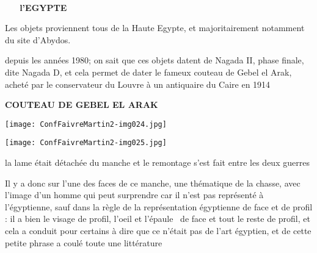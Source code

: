 \documentclass[a4paper]{article}
\begin{document}
\bigskip


\bigskip


\bigskip


\bigskip


\bigskip


\bigskip


\bigskip


\bigskip


\bigskip


\bigskip

{
\textbf{\ \ \ \ \ \ \ \ \ \ \ \ \ \ \ \ \ \ \ \ \ \ \ \ \ \ \ \ \ \ \ \ \ \ \ \ \ \ \ \ \ \ \ \ \ \ \ \ \ \ \ \ \ \ \ \ \ \ \ \ \ \ \ \ \ l'EGYPTE}}


\bigskip


\bigskip


\bigskip


\bigskip

{
Les objets proviennent tous de la Haute Egypte, et majoritairement notamment du site d'Abydos.}

{
depuis les années 1980; on sait que ces objets datent de Nagada II, phase finale, dite Nagada D, et cela permet de dater
le fameux couteau de Gebel el Arak, acheté par le conservateur du Louvre à un antiquaire du Caire en 1914}


\bigskip


\bigskip


\bigskip

{
\textbf{COUTEAU DE GEBEL EL ARAK\ \ }}


\bigskip


\bigskip


\bigskip

 \texttt{[image: ConfFaivreMartin2-img024.jpg]} 


\bigskip


\bigskip

 \texttt{[image: ConfFaivreMartin2-img025.jpg]} 


\bigskip


\bigskip


\bigskip


\bigskip

{
la lame était détachée du manche et le remontage s'est fait entre les deux guerres}


\bigskip

{
Il y a donc sur l'une des faces de ce manche, une thématique de la chasse, avec l'image d'un homme qui peut surprendre
car il n'est pas représenté à l'égyptienne, sauf dans la règle de la représentation égyptienne de face et de profil :
il a bien le visage de profil, l'oeil et l'épaule \ de face et tout le reste de profil, et cela a conduit pour certains
à dire que ce n'était pas de l'art égyptien, et de cette petite phrase a coulé toute une littérature}
\end{document}
